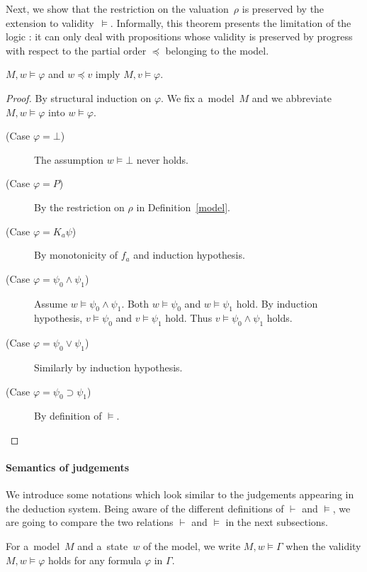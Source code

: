 Next, we show that the restriction on the valuation~$\rho$ is preserved by the extension
to validity~$\models$. Informally, this theorem presents the limitation of the logic \iec:
it can only deal with propositions whose validity is preserved by progress with respect to
the partial order $\preceq$ belonging to the model.
\begin{theorem}
\label{kripke}
$M,w\models \varphi$ and $w\preceq v$ imply
$M,v\models \varphi$.
\end{theorem}
\begin{proof}
 By structural induction on $\varphi$.
 We fix a~model~$M$ and we abbreviate $M,w \models
 \varphi$ into $w\models \varphi$.
\begin{description}
 \item[(Case $\varphi = \bot$)]  The assumption $w\models \bot$ never holds.
 \item[(Case $\varphi = P$)] By the restriction on $\rho$ in Definition~\ref{model}.
 \item[(Case $\varphi = K_a \psi$)] 
	    By monotonicity of $f_a$ and induction hypothesis.
 \item[(Case $\varphi = \psi_0\wedge\psi_1$)] 
	    Assume $w\models \psi_0\wedge \psi_1$.
	    Both $w\models \psi_0$ and $w\models \psi_1$ hold. 
	    By induction hypothesis, $v\models\psi_0$ and
	    $v\models\psi_1$ hold.
	    Thus
	    $v\models \psi_0\wedge \psi_1$ holds.
 \item[(Case $\varphi = \psi_0\vee\psi_1$)] 
	    Similarly by induction hypothesis.
 \item[(Case $\varphi =\psi_0\supset\psi_1$)]
	    By definition of $\models$.
\end{description}
\end{proof}

\paragraph{Semantics of judgements}

We introduce some notations which look similar to the judgements appearing in the 
deduction
system.
Being aware of the different definitions of $\vdash$ and $\models$, we are going to
compare the two relations $\vdash$ and $\models$ in the next subsections.

\begin{notation}
For a~model~$M$ and a~state~$w$ of the model,
we write $M,w\models \Gamma$ when the validity
$M,w\models\varphi$ holds for any formula $\varphi$ in $\Gamma$.
\end{notation}

